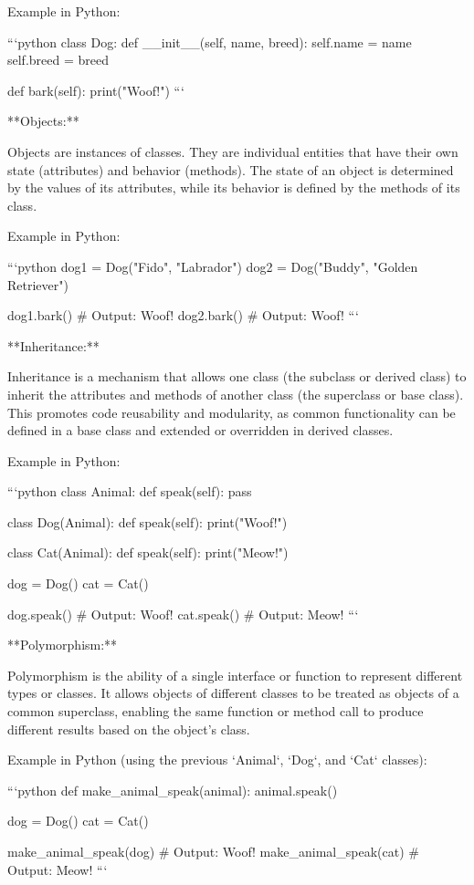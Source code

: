 \documentclass{article}
\begin{document}
Example in Python:

```python
class Dog:
    def __init__(self, name, breed):
        self.name = name
        self.breed = breed

    def bark(self):
        print("Woof!")
```

**Objects:**

Objects are instances of classes. They are individual entities that have their own state (attributes) and behavior (methods). The state of an object is determined by the values of its attributes, while its behavior is defined by the methods of its class.

Example in Python:

```python
dog1 = Dog("Fido", "Labrador")
dog2 = Dog("Buddy", "Golden Retriever")

dog1.bark()  # Output: Woof!
dog2.bark()  # Output: Woof!
```

**Inheritance:**

Inheritance is a mechanism that allows one class (the subclass or derived class) to inherit the attributes and methods of another class (the superclass or base class). This promotes code reusability and modularity, as common functionality can be defined in a base class and extended or overridden in derived classes.

Example in Python:

```python
class Animal:
    def speak(self):
        pass

class Dog(Animal):
    def speak(self):
        print("Woof!")

class Cat(Animal):
    def speak(self):
        print("Meow!")

dog = Dog()
cat = Cat()

dog.speak()  # Output: Woof!
cat.speak()  # Output: Meow!
```

**Polymorphism:**

Polymorphism is the ability of a single interface or function to represent different types or classes. It allows objects of different classes to be treated as objects of a common superclass, enabling the same function or method call to produce different results based on the object's class.

Example in Python (using the previous `Animal`, `Dog`, and `Cat` classes):

```python
def make_animal_speak(animal):
    animal.speak()

dog = Dog()
cat = Cat()

make_animal_speak(dog)  # Output: Woof!
make_animal_speak(cat)  # Output: Meow!
```
\end{document}
